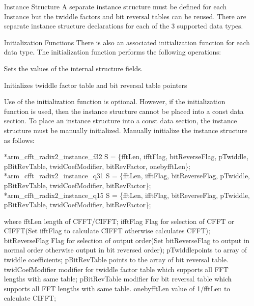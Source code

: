 \begin{DoxyParagraph}{Instance Structure }
A separate instance structure must be defined for each Instance but the twiddle factors and bit reversal tables can be reused. There are separate instance structure declarations for each of the 3 supported data types.
\end{DoxyParagraph}
\begin{DoxyParagraph}{Initialization Functions }
There is also an associated initialization function for each data type. The initialization function performs the following operations\-:
\begin{DoxyItemize}
\item Sets the values of the internal structure fields.
\item Initializes twiddle factor table and bit reversal table pointers 
\end{DoxyItemize}
\end{DoxyParagraph}
\begin{DoxyParagraph}{}
Use of the initialization function is optional. However, if the initialization function is used, then the instance structure cannot be placed into a const data section. To place an instance structure into a const data section, the instance structure must be manually initialized. Manually initialize the instance structure as follows\-: 
\begin{DoxyPre}   
*arm\_cfft\_radix2\_instance\_f32 S = \{fftLen, ifftFlag, bitReverseFlag, pTwiddle, pBitRevTable, twidCoefModifier, bitRevFactor, onebyfftLen\};   
*arm\_cfft\_radix2\_instance\_q31 S = \{fftLen, ifftFlag, bitReverseFlag, pTwiddle, pBitRevTable, twidCoefModifier, bitRevFactor\};   
*arm\_cfft\_radix2\_instance\_q15 S = \{fftLen, ifftFlag, bitReverseFlag, pTwiddle, pBitRevTable, twidCoefModifier, bitRevFactor\};   
  \end{DoxyPre}
 
\end{DoxyParagraph}
\begin{DoxyParagraph}{}
where {\ttfamily fft\-Len} length of C\-F\-F\-T/\-C\-I\-F\-F\-T; {\ttfamily ifft\-Flag} Flag for selection of C\-F\-F\-T or C\-I\-F\-F\-T(\-Set ifft\-Flag to calculate C\-I\-F\-F\-T otherwise calculates C\-F\-F\-T); {\ttfamily bit\-Reverse\-Flag} Flag for selection of output order(\-Set bit\-Reverse\-Flag to output in normal order otherwise output in bit reversed order); {\ttfamily p\-Twiddle}points to array of twiddle coefficients; {\ttfamily p\-Bit\-Rev\-Table} points to the array of bit reversal table. {\ttfamily twid\-Coef\-Modifier} modifier for twiddle factor table which supports all F\-F\-T lengths with same table; {\ttfamily p\-Bit\-Rev\-Table} modifier for bit reversal table which supports all F\-F\-T lengths with same table. {\ttfamily onebyfft\-Len} value of 1/fft\-Len to calculate C\-I\-F\-F\-T;
\end{DoxyParagraph}
